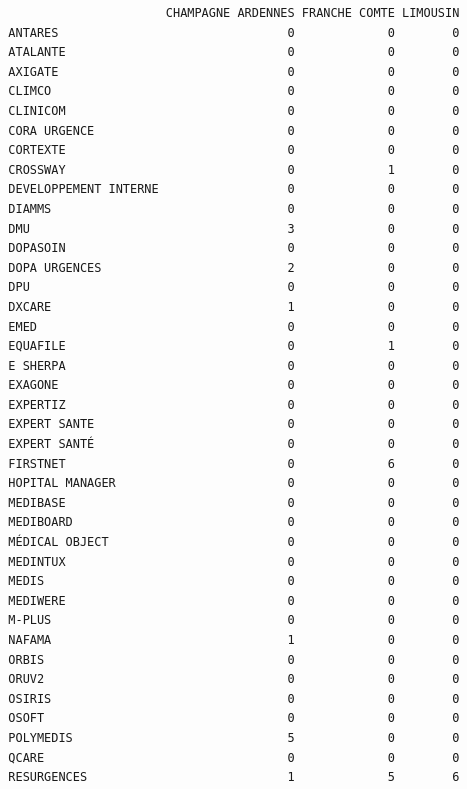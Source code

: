 \documentclass[]{article}
\begin{document}
\begin{verbatim}
                        CHAMPAGNE ARDENNES FRANCHE COMTE LIMOUSIN
  ANTARES                                0             0        0
  ATALANTE                               0             0        0
  AXIGATE                                0             0        0
  CLIMCO                                 0             0        0
  CLINICOM                               0             0        0
  CORA URGENCE                           0             0        0
  CORTEXTE                               0             0        0
  CROSSWAY                               0             1        0
  DEVELOPPEMENT INTERNE                  0             0        0
  DIAMMS                                 0             0        0
  DMU                                    3             0        0
  DOPASOIN                               0             0        0
  DOPA URGENCES                          2             0        0
  DPU                                    0             0        0
  DXCARE                                 1             0        0
  EMED                                   0             0        0
  EQUAFILE                               0             1        0
  E SHERPA                               0             0        0
  EXAGONE                                0             0        0
  EXPERTIZ                               0             0        0
  EXPERT SANTE                           0             0        0
  EXPERT SANTÉ                           0             0        0
  FIRSTNET                               0             6        0
  HOPITAL MANAGER                        0             0        0
  MEDIBASE                               0             0        0
  MEDIBOARD                              0             0        0
  MÉDICAL OBJECT                         0             0        0
  MEDINTUX                               0             0        0
  MEDIS                                  0             0        0
  MEDIWERE                               0             0        0
  M-PLUS                                 0             0        0
  NAFAMA                                 1             0        0
  ORBIS                                  0             0        0
  ORUV2                                  0             0        0
  OSIRIS                                 0             0        0
  OSOFT                                  0             0        0
  POLYMEDIS                              5             0        0
  QCARE                                  0             0        0
  RESURGENCES                            1             5        6

\end{verbatim}
\end{document}
